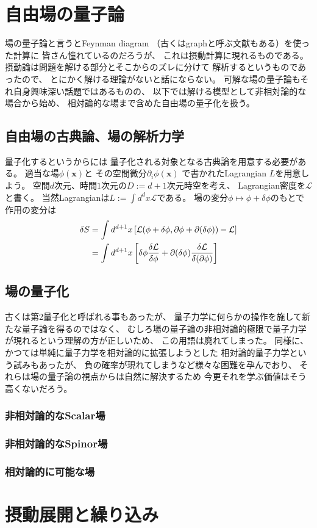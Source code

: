 \section{自由場の量子論}
\label{sec: QFT}

場の量子論と言うとFeynman diagram
（古くはgraphと呼ぶ文献もある）を使った計算に
皆さん憧れているのだろうが、
これは摂動計算に現れるものである。
摂動論は問題を解ける部分とそこからのズレに分けて
解析するというものであったので、
とにかく解ける理論がないと話にならない。
可解な場の量子論もそれ自身興味深い話題ではあるものの、
以下では解ける模型として非相対論的な場合から始め、
相対論的な場まで含めた自由場の量子化を扱う。

\subsection{自由場の古典論、場の解析力学}

量子化するというからには
量子化される対象となる古典論を用意する必要がある。
適当な場$\phi(\bm{x})$と
その空間微分$\partial_i \phi(\bm{x})$
で書かれたLagrangian $L$を用意しよう。
空間$d$次元、時間$1$次元の$D:= d+1$次元時空を考え、
Lagrangian密度を$\mathcal{L}$と書く。
当然Lagrangianは$L := \int d^d x \mathcal{L}$である。
場の変分$\phi \mapsto \phi + \delta \phi$のもとで
作用の変分は
\begin{align}
    \delta S
    &=
    \int d^{d+1} x
    \left[
        \mathcal{L}(\phi + \delta \phi ,
        \partial \phi + \partial (\delta \phi))
        - \mathcal{L}
    \right]
\notag\\&=
    \int d^{d+1} x
    \left[
        \delta \phi
        \dfrac{\delta \mathcal{L}}{\delta \phi}
        +
        \partial (\delta \phi)
        \dfrac{\delta \mathcal{L}}{\delta (\partial\phi)}
    \right]
\end{align}


\subsection{場の量子化}

古くは第2量子化と呼ばれる事もあったが、
量子力学に何らかの操作を施して新たな量子論を得るのではなく、
むしろ場の量子論の非相対論的極限で量子力学が現れるという理解の方が正しいため、
この用語は廃れてしまった。
同様に、かつては単純に量子力学を相対論的に拡張しようとした
相対論的量子力学という試みもあったが、
負の確率が現れてしまうなど様々な困難を孕んでおり、
それらは場の量子論の視点からは自然に解決するため
今更それを学ぶ価値はそう高くないだろう。

\subsubsection{非相対論的なScalar場}

\subsubsection{非相対論的なSpinor場}

\subsubsection{相対論的に可能な場}

\section{摂動展開と繰り込み}
